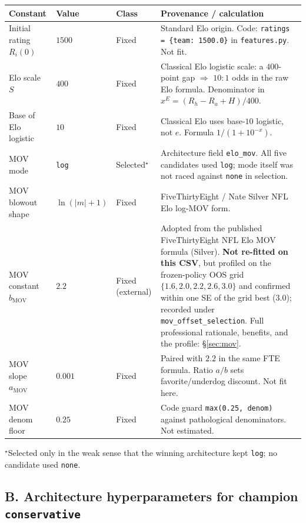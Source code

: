 \documentclass[10pt]{article}
\newcommand{\code}[1]{\texttt{#1}}
\begin{document}
\begin{longtable}{@{}>{\raggedright\arraybackslash}p{1.15in}
>{\raggedright\arraybackslash}p{0.72in}
>{\raggedright\arraybackslash}p{0.72in}
>{\raggedright\arraybackslash}p{3.55in}@{}}
\toprule
\textbf{Constant} & \textbf{Value} & \textbf{Class} & \textbf{Provenance / calculation} \\
\midrule
\endhead
Initial rating \(R_i(0)\) & \(1500\) & Fixed & Standard Elo origin. Code: \code{ratings = \{team: 1500.0\}} in \code{features.py}. Not fit. \\
Elo scale \(S\) & \(400\) & Fixed & Classical Elo logistic scale: a \(400\)-point gap \(\Rightarrow\) \(10{:}1\) odds in the raw Elo formula. Denominator in \(x^{E}=(R_h-R_a+H)/400\). \\
Base of Elo logistic & \(10\) & Fixed & Classical Elo uses base-\(10\) logistic, not \(e\). Formula \(1/(1+10^{-x})\). \\
MOV mode & \texttt{log} & Selected$^\star$ & Architecture field \code{elo\_mov}. All five candidates used \texttt{log}; mode itself was not raced against \texttt{none} in selection. \\
MOV blowout shape & \(\ln(|m|+1)\) & Fixed & FiveThirtyEight / Nate Silver NFL Elo log-MOV form. \\
MOV constant \(b_{\mathrm{MOV}}\) & \(2.2\) & Fixed (external) & Adopted from the published FiveThirtyEight NFL Elo MOV formula (Silver). \textbf{Not re-fitted on this CSV}, but profiled on the frozen-policy OOS grid \(\{1.6,2.0,2.2,2.6,3.0\}\) and confirmed within one SE of the grid best (\(3.0\)); recorded under \code{mov\_offset\_selection}. Full professional rationale, benefits, and the profile: \S\ref{sec:mov}. \\
MOV slope \(a_{\mathrm{MOV}}\) & \(0.001\) & Fixed & Paired with \(2.2\) in the same FTE formula. Ratio \(a/b\) sets favorite/underdog discount. Not fit here. \\
MOV denom floor & \(0.25\) & Fixed & Code guard \code{max(0.25, denom)} against pathological denominators. Not estimated. \\
\bottomrule
\end{longtable}
{\footnotesize $^\star$Selected only in the weak sense that the winning architecture kept \texttt{log}; no candidate used \texttt{none}.}

\subsection{B. Architecture hyperparameters for champion \texttt{conservative}}
\end{document}
